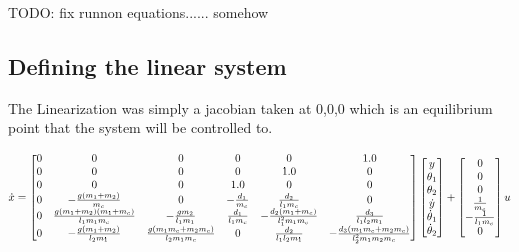 {\LARGE \color{red} TODO: fix runnon equations...... somehow}

\subsection{Defining the linear system}
The Linearization was simply a jacobian taken at 0,0,0 which is an equilibrium point that the system will be
controlled to.

\begin{equation}
 \dot x = \left[\begin{matrix}0 & 0 & 0 & 0 & 0 & 1.0\\0 & 0 & 0 & 0 & 1.0 & 0\\0 & 0 & 0 & 1.0 & 0 & 0\\0 & - \frac{g \left(m_{1} + m_{2}\right)}{m_{c}} & 0 & - \frac{d_{1}}{m_{c}} & \frac{d_{2}}{l_{1} m_{c}} & 0\\0 & \frac{g \left(m_{1} + m_{2}\right) \left(m_{1} + m_{c}\right)}{l_{1} m_{1} m_{c}} & - \frac{g m_{2}}{l_{1} m_{1}} & \frac{d_{1}}{l_{1} m_{c}} & - \frac{d_{2} \left(m_{1} + m_{c}\right)}{l_{1}^{2} m_{1} m_{c}} & \frac{d_{3}}{l_{1} l_{2} m_{1}}\\0 & - \frac{g \left(m_{1} + m_{2}\right)}{l_{2} m_{1}} & \frac{g \left(m_{1} m_{c} + m_{2} m_{c}\right)}{l_{2} m_{1} m_{c}} & 0 & \frac{d_{2}}{l_{1} l_{2} m_{1}} & - \frac{d_{3} \left(m_{1} m_{c} + m_{2} m_{c}\right)}{l_{2}^{2} m_{1} m_{2} m_{c}}\end{matrix}\right]\left[\begin{matrix}y\\\theta_{1}\\\theta_{2}\\\dot y\\\dot\theta_{1}\\\dot\theta_{2}\end{matrix}\right] + \left[\begin{matrix}0\\0\\0\\\frac{1}{m_{c}}\\- \frac{1}{l_{1} m_{c}}\\0\end{matrix}\right]u
\end{equation}

